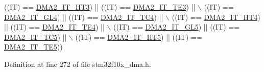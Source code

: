 \begin{DoxyCode}
                           ((IT) == \hyperlink{group___d_m_a__interrupts__definition_gab3c0d024e03f9fdca539710c7e528904}{DMA2\_IT\_HT3}) || ((IT) == 
      \hyperlink{group___d_m_a__interrupts__definition_ga2fd4ce5d7e2d67c05379f826ae1b1da6}{DMA2\_IT\_TE3}) || \(\backslash\)
                           ((IT) == \hyperlink{group___d_m_a__interrupts__definition_ga004761fbcd7dba2f242639b2992ada17}{DMA2\_IT\_GL4}) || ((IT) == 
      \hyperlink{group___d_m_a__interrupts__definition_ga54b6716e82894f76c87926afe2a65f30}{DMA2\_IT\_TC4}) || \(\backslash\)
                           ((IT) == \hyperlink{group___d_m_a__interrupts__definition_ga4aa775a2f1e10783bd43911ad65bb28b}{DMA2\_IT\_HT4}) || ((IT) == 
      \hyperlink{group___d_m_a__interrupts__definition_ga54dfd8a41ad683f01e3103e6473a7aff}{DMA2\_IT\_TE4}) || \(\backslash\)
                           ((IT) == \hyperlink{group___d_m_a__interrupts__definition_ga2205d7e002767d98f7aa206634374082}{DMA2\_IT\_GL5}) || ((IT) == 
      \hyperlink{group___d_m_a__interrupts__definition_gaa1134531a0aeb8daeb516985562129b0}{DMA2\_IT\_TC5}) || \(\backslash\)
                           ((IT) == \hyperlink{group___d_m_a__interrupts__definition_ga4c1e0d1572267c1d48d787009148e3ef}{DMA2\_IT\_HT5}) || ((IT) == 
      \hyperlink{group___d_m_a__interrupts__definition_gad47115e9a4d0d3f5d9101097983b5525}{DMA2\_IT\_TE5}))
\end{DoxyCode}


Definition at line 272 of file stm32f10x\+\_\+dma.\+h.

